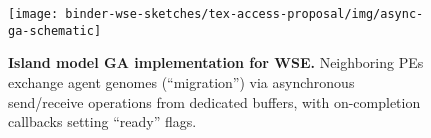 \begin{figure}
  \centering
\texttt{[image: binder-wse-sketches/tex-access-proposal/img/async-ga-schematic]}
  \caption{%
  \textbf{Island model GA implementation for WSE.}
  Neighboring PEs exchange agent genomes (``migration'') via asynchronous send/receive operations from dedicated buffers, with on-completion callbacks setting ``ready'' flags.
  }
  \label{fig:async-ga-schematic}
  \vspace{-0.2in}
\end{figure}
